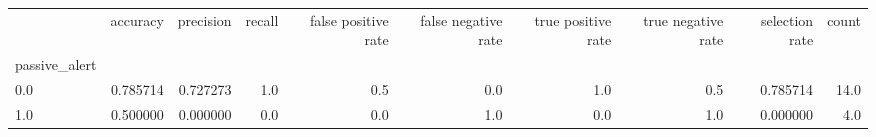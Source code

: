 \begin{tabular}{lrrrrrrrrr}
\toprule
{} &  accuracy &  precision &  recall &  false positive rate &  false negative rate &  true positive rate &  true negative rate &  selection rate &  count \\
passive\_alert &           &            &         &                      &                      &                     &                     &                 &        \\
\midrule
0.0           &  0.785714 &   0.727273 &     1.0 &                  0.5 &                  0.0 &                 1.0 &                 0.5 &        0.785714 &   14.0 \\
1.0           &  0.500000 &   0.000000 &     0.0 &                  0.0 &                  1.0 &                 0.0 &                 1.0 &        0.000000 &    4.0 \\
\bottomrule
\end{tabular}
